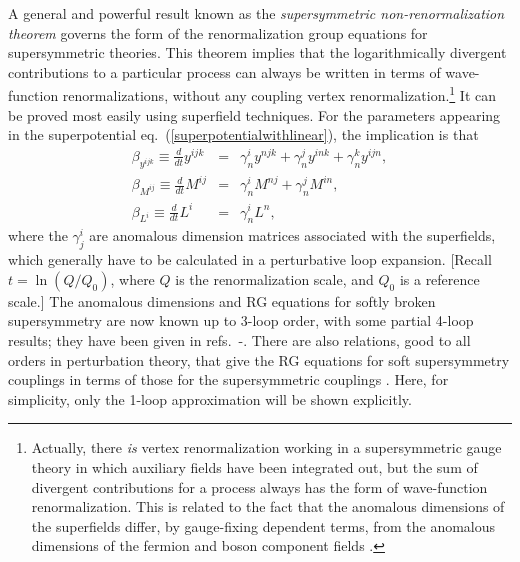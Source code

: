 \documentclass[12pt]{article}
\def\beq{\begin{eqnarray}}
\def\eeq{\end{eqnarray}}
\begin{document}
A general and powerful result known as the {\it supersymmetric
non-renormalization theorem} \cite{nonrentheo} governs the form of the
renormalization group equations for supersymmetric theories. This theorem
implies that the logarithmically divergent contributions to a particular
process can always be written in terms of wave-function renormalizations,
without any coupling vertex renormalization.\footnote{Actually, there {\it
is} vertex renormalization working in a supersymmetric gauge theory in
which auxiliary fields have been integrated out, but the sum of divergent
contributions for a process always has the form of wave-function
renormalization. This is related to the fact that the anomalous dimensions
of the superfields differ, by gauge-fixing dependent terms, from the
anomalous dimensions of the fermion and boson component fields
\cite{Jonesreview}.} It can be proved most easily using superfield
techniques. For the parameters appearing in the superpotential
eq.~(\ref{superpotentialwithlinear}), the implication is that
\beq
\beta_{y^{ijk}} \equiv \frac{d}{dt}y^{ijk} \!&=&\! 
\gamma^i_n y^{njk} + \gamma^j_n y^{ink} + \gamma^k_n y^{ijn},
\label{eq:genyrge}
\\
\beta_{M^{ij}} \equiv \frac{d}{dt}M^{ij} \!&=&\! 
\gamma^i_n M^{nj} + \gamma^j_n M^{in},
\label{eq:genMrge}
\\
\beta_{L^{i}} \equiv \frac{d}{dt}L^{i} \!&=&\! 
\gamma^i_n L^{n},
\eeq
where the $\gamma^i_j$ are anomalous dimension matrices associated with
the superfields, which generally have to be calculated in a perturbative
loop expansion. [Recall $t = \ln(Q/Q_0)$, where $Q$ is the renormalization
scale, and $Q_0$ is a reference scale.] The anomalous dimensions and RG
equations for softly broken supersymmetry are now known up to 3-loop
order, with some partial 4-loop results; they have been given in
refs.~\cite{rges2gauge}-\cite{fourloops}. 
There are also relations, good to all orders in perturbation
theory, that give the RG equations for soft supersymmetry couplings in
terms of those for the supersymmetric couplings \cite{Shifman,allorders}.
Here, for simplicity, only the 1-loop approximation will be shown
explicitly. 
\end{document}
